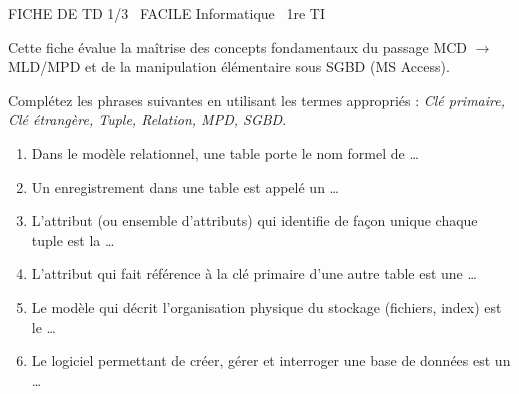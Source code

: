 \documentclass[11pt]{article}
\begin{document}
\begin{tcolorbox}[enhanced,colback=popink,colframe=popink,arc=10pt,boxrule=0pt,left=12pt,right=12pt,top=9pt,bottom=9pt]
{\color{white}\popxbold\small FICHE DE TD 1/3 \textbullet\ FACILE \hfill Informatique \textbullet\ 1re TI\par}
\end{tcolorbox}
\vspace{4pt}
Cette fiche évalue la maîtrise des concepts fondamentaux du passage MCD $\rightarrow$ MLD/MPD et de la manipulation élémentaire sous SGBD (MS Access).

\begin{exercice}
Complétez les phrases suivantes en utilisant les termes appropriés : \textit{Clé primaire, Clé étrangère, Tuple, Relation, MPD, SGBD}.
\begin{enumerate}
    \item Dans le modèle relationnel, une table porte le nom formel de \ldots
    \item Un enregistrement dans une table est appelé un \ldots
    \item L'attribut (ou ensemble d'attributs) qui identifie de façon unique chaque tuple est la \ldots
    \item L'attribut qui fait référence à la clé primaire d'une autre table est une \ldots
    \item Le modèle qui décrit l'organisation physique du stockage (fichiers, index) est le \ldots
    \item Le logiciel permettant de créer, gérer et interroger une base de données est un \ldots
\end{enumerate}
\end{exercice}
\end{document}

